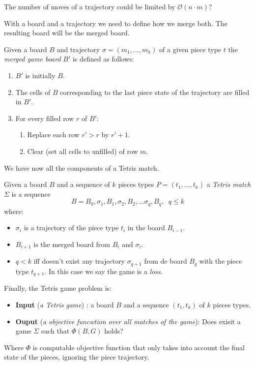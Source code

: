 The number of moves of a trajectory could be limited by $\mathcal{O}(n \cdot m)$?

With a board and a trajectory we need to define how we merge both. The resulting board will be the merged board. 

\begin{definition}
  Given a board $B$ and trajectory $\sigma = (m_1, ..., m_k)$ of a given piece type $t$ the \emph{merged game board} $B'$ is defined as follows:
  \begin{enumerate}
    \item $B'$ is initially $B$.
    \item The cells of $B$ corresponding to the last piece state of the trajectory are filled in $B'$.
    \item For every filled row $r$ of $B'$:
      \begin{enumerate}
        \item Replace each row $r' > r$ by $r'+1$.
        \item Clear (set all cells to unfilled) of row $m$.
      \end{enumerate}
  \end{enumerate}
\end{definition}

We have now all the components of a Tetris match.

\begin{definition}
  Given a board $B$ and a sequence of $k$ pieces types $P = (t_1,\dots,t_k)$ a \emph{Tetris match} $\Sigma$ is a sequence
  $$ B = B_0, \sigma_1, B_1, \sigma_2, B_2, \dots  \sigma_q, B_q, \; \; q \leq k$$ 
  where:
  \begin{itemize}
    \item $\sigma_i$ is a trajectory of the piece type $t_i$ in the board $B_{i-1}$.
    \item $B_{i+1}$ is the merged board from $B_i$ and $\sigma_i$.
    \item $q < k$ iff doesn't exist any trajectory $\sigma_{q+1}$ from de board $B_q$ with the piece type $t_{q+1}$. In this case we say the game is a \emph{loss}.
  \end{itemize}
\end{definition}

Finally, the Tetris game problem is:
\begin{itemize}
  \item \textbf{Input} (\textit{a Tetris game}) : a board $B$ and a sequence $(t_1, t_k)$ of $k$ pieces types.
  
  \item \textbf{Ouput} (\textit{a objective funcwtion over all matches of the game}): Does exisit a game $\Sigma$ such that $\Phi ( B, G )$ holds? 
\end{itemize}

Where $\Phi$ is computable objective function that only takes into account the final state of the pieces, ignoring the piece trajectory.
